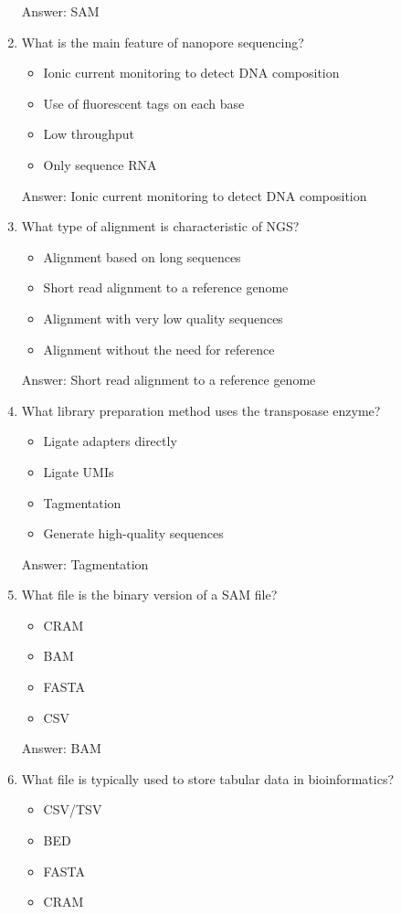 \begin{enumerate}
Answer: SAM

\item What is the main feature of nanopore sequencing?
\begin{itemize}
\item Ionic current monitoring to detect DNA composition
\item Use of fluorescent tags on each base
\item Low throughput
\item Only sequence RNA
\end{itemize}

Answer: Ionic current monitoring to detect DNA composition

\item What type of alignment is characteristic of NGS?
\begin{itemize}
\item Alignment based on long sequences
\item Short read alignment to a reference genome
\item Alignment with very low quality sequences
\item Alignment without the need for reference
\end{itemize}

Answer: Short read alignment to a reference genome

\item What library preparation method uses the transposase enzyme?
\begin{itemize}
\item Ligate adapters directly
\item Ligate UMIs
\item Tagmentation
\item Generate high-quality sequences
\end{itemize}

Answer: Tagmentation

\item What file is the binary version of a SAM file?
\begin{itemize}
\item CRAM
\item BAM
\item FASTA
\item CSV
\end{itemize}

Answer: BAM

\item What file is typically used to store tabular data in bioinformatics?
\begin{itemize}
\item CSV/TSV
\item BED
\item FASTA
\item CRAM
\end{itemize}


\end{enumerate}
